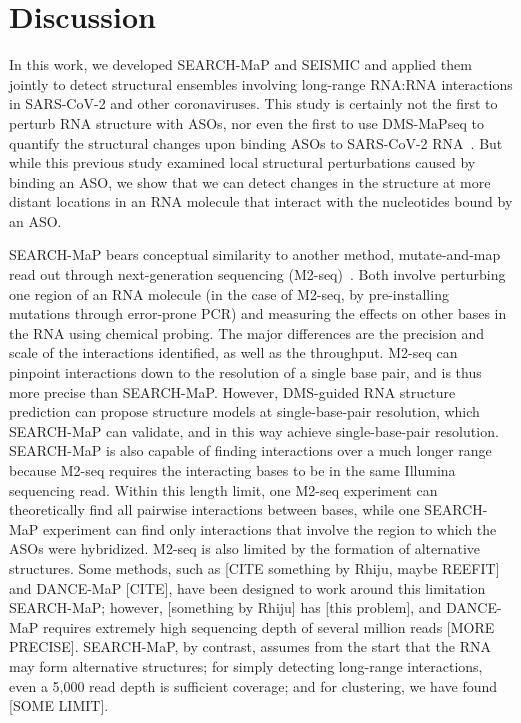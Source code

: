 \documentclass[main.tex]{subfiles}
\begin{document}
\section{Discussion}
\label{discussion}

In this work, we developed SEARCH-MaP and SEISMIC and applied them jointly to detect structural ensembles involving long-range RNA:RNA interactions in SARS-CoV-2 and other coronaviruses. This study is certainly not the first to perturb RNA structure with ASOs, nor even the first to use DMS-MaPseq to quantify the structural changes upon binding ASOs to SARS-CoV-2 RNA~\cite{Zhu2022}. But while this previous study examined local structural perturbations caused by binding an ASO, we show that we can detect changes in the structure at more distant locations in an RNA molecule that interact with the nucleotides bound by an ASO.

SEARCH-MaP bears conceptual similarity to another method, mutate-and-map read out through next-generation sequencing (M2-seq)~\cite{Cheng2017}. Both involve perturbing one region of an RNA molecule (in the case of M2-seq, by pre-installing mutations through error-prone PCR) and measuring the effects on other bases in the RNA using chemical probing. The major differences are the precision and scale of the interactions identified, as well as the throughput. M2-seq can pinpoint interactions down to the resolution of a single base pair, and is thus more precise than SEARCH-MaP. However, DMS-guided RNA structure prediction can propose structure models at single-base-pair resolution, which SEARCH-MaP can validate, and in this way achieve single-base-pair resolution. SEARCH-MaP is also capable of finding interactions over a much longer range because M2-seq requires the interacting bases to be in the same Illumina sequencing read. Within this length limit, one M2-seq experiment can theoretically find all pairwise interactions between bases, while one SEARCH-MaP experiment can find only interactions that involve the region to which the ASOs were hybridized. M2-seq is also limited by the formation of alternative structures. Some methods, such as [CITE something by Rhiju, maybe REEFIT] and DANCE-MaP [CITE], have been designed to work around this limitation SEARCH-MaP; however, [something by Rhiju] has [this problem], and DANCE-MaP requires extremely high sequencing depth of several million reads [MORE PRECISE]. SEARCH-MaP, by contrast, assumes from the start that the RNA may form alternative structures; for simply detecting long-range interactions, even a 5,000 read depth is sufficient coverage; and for clustering, we have found [SOME LIMIT].
\end{document}
